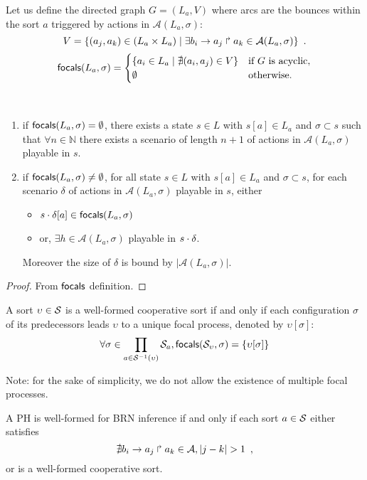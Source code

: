 \begin{definition}
Let us define the directed graph $G = (L_a, V)$ where arcs are the bounces within the sort $a$
triggered by actions in $\mathcal A(L_a,\sigma)$:
\[V = \{(a_j,a_k)\in (L_a \times L_a) \mid 
			\exists b_i\rightarrow a_j\Rsh a_k\in \mathcal A(L_a,\sigma)\}\enspace.\]
\[
\mathsf{focals}(L_a,\sigma) = 
\begin{cases}
\{ a_i \in L_a \mid \nexists (a_i,a_j)\in V\} & \text{if $G$ is acyclic},\\
\emptyset & \text{otherwise.}\\
\end{cases}
\]
\end{definition}
\begin{lemma}~
\begin{enumerate}
\item if $\mathsf{focals}(L_a,\sigma)=\emptyset$, there exists a 
state $s\in L$ with $s[a]\in L_a$ and $\sigma\subset s$
such that $\forall n\in\mathbb N$ there 
exists a scenario of length $n+1$ of actions in $\mathcal A(L_a,\sigma)$ playable in $s$.
\item if $\mathsf{focals}(L_a,\sigma)\neq\emptyset$, for all
state $s\in L$ with $s[a]\in L_a$ and $\sigma\subset s$, for each scenario $\delta$ of actions in
$\mathcal A(L_a,\sigma)$ playable in $s$,
either
\begin{itemize}
\item $s\cdot\delta[a] \in \mathsf{focals}(L_a,\sigma)$
\item or, $\exists h\in \mathcal A(L_a,\sigma)$ playable in $s\cdot\delta$.
\end{itemize}
Moreover the size of $\delta$ is bound by $|\mathcal A(L_a,\sigma)|$.
\end{enumerate}
\end{lemma}
\begin{proof}
From $\mathsf{focals}$ definition.
\end{proof}
\begin{property}
A sort $\upsilon\in\mathcal{S}$ is a well-formed cooperative sort if and only if
each configuration $\sigma$ of its predecessors leads $\upsilon$ to a unique focal process,
denoted by $\upsilon[\sigma]$:
\[
\forall \sigma \in \prod_{a\in\mathcal{S}^{-1}(\upsilon)} \mathcal{S}_{a},
\mathsf{focals}(\mathcal{S}_\upsilon,\sigma) = \{ \upsilon[\sigma] \}\]
\end{property}
Note: for the sake of simplicity, we do not allow the existence of multiple focal processes.

\begin{property}
A PH is well-formed for BRN inference if and only if each sort $a\in\mathcal{S}$ either satisfies
\[\nexists b_i\rightarrow a_j\Rsh a_k\in\mathcal{A}, |j-k| > 1
\enspace,\]
or is a well-formed cooperative sort.
\end{property}

